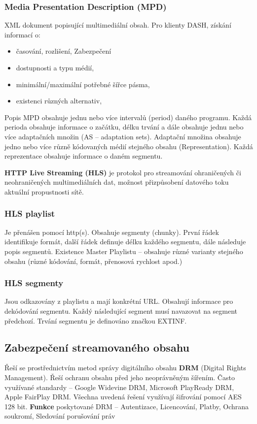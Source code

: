 \subsubsection{Media Presentation Description (MPD)}
XML dokument popisující multimediální obsah. Pro klienty DASH, získání informací o: \vspace{-4mm}
\begin{itemize}
    \item časování, rozlišení, Zabezpečení
\item dostupnosti  a typu médií,
\item minimální/maximální potřebné šířce pásma,
\item existenci různých alternativ,
\end{itemize}

Popis MPD obsahuje jednu nebo více intervalů (period) daného programu. Každá perioda obsahuje informace o začátku, délku trvání a dále obsahuje jednu nebo více adaptačních množin (AS – adaptation sets). Adaptační množina obsahuje jedno nebo více různě kódovaných médií stejného obsahu (Representation). Každá reprezentace obsahuje informace o daném segmentu.

\textbf{HTTP Live Streaming (HLS)} je protokol pro streamování ohraničených či neohraničených multimediálních dat, možnost přizpůsobení datového toku aktuální propustnosti sítě.

\subsubsection{HLS playlist}
Je přenášen pomocí http(s). Obsahuje segmenty (chunky). První řádek identifikuje formát, další řádek definuje délku každého segmentu, dále následuje popis segmentů. Existence Master Playlistu -- obsahuje různé varianty stejného obsahu (různé kódování, formát, přenosová rychlost apod.)

\subsubsection{HLS segmenty}
Jsou odkazovány z playlistu a mají konkrétní URL. Obsahují informace pro dekódování segmentu. Každý následující segment musí navazovat na segment předchozí. Trvání segmentu je definováno značkou EXTINF.


\subsection{Zabezpečení streamovaného obsahu}

Řeší se prostřednictvím metod správy digitálního obsahu \textbf{DRM} (Digital Rights Management). Řeší ochranu obsahu před jeho neoprávněným šířením. Často využívané standardy -- Google Widevine DRM, Microsoft PlayReady DRM,  Apple FairPlay DRM. Všechna uvedená řešení využívají šifrování pomocí AES 128 bit. \textbf{Funkce} poskytované DRM -- Autentizace, Licencování, Platby, Ochrana soukromí, Sledování porušování práv

